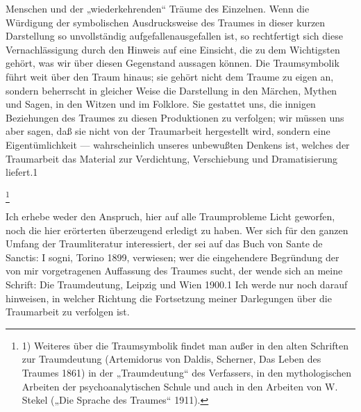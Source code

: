 \documentclass[twoside=true,titlepage=false,open=any, parskip=never, fontsize=10pt, headings=small, chapterprefix=false, appendixprefix=false]{scrbook}
\begin{document}
         
            
            
            
        \pstart
        Menschen und der „wiederkehrenden“ Träume des Einzelnen. Wenn die
               Würdigung der symbolischen Ausdrucksweise des Traumes in dieser kurzen
               Darstellung so unvollständig aufgefallenausgefallen ist, so rechtfertigt sich diese
               Vernachlässigung durch den Hinweis auf eine Einsicht, die zu dem
               Wichtigsten gehört, was wir über diesen Gegenstand aussagen können. Die
               Traumsymbolik führt weit über den Traum hinaus; sie gehört nicht dem Traume
               zu eigen an, sondern beherrscht in gleicher Weise die Darstellung in den
               Märchen, Mythen und Sagen, in den Witzen und im Folklore. Sie gestattet uns, die
               innigen Beziehungen des Traumes zu diesen Produktionen zu verfolgen; wir müssen
               uns aber sagen, daß sie nicht von der Traumarbeit hergestellt wird, sondern
               eine Eigentümlichkeit — wahrscheinlich unseres unbewußten Denkens
               ist, welches der Traumarbeit das Material zur Verdichtung, Verschiebung und
               Dramatisierung liefert.1
        \pend
    
            
        \footnote{1) Weiteres über die
               Traumsymbolik findet man außer in den alten Schriften zur Traumdeutung (Artemidorus von Daldis, Scherner, Das Leben des
               Traumes 1861) in der „Traumdeutung“ des Verfassers, in den mythologischen
               Arbeiten der psychoanalytischen Schule und auch in den Arbeiten von W. Stekel („Die Sprache des Traumes“ 1911).}
    
         
            
            
            \pend
            
        \pstart
        Ich erhebe weder den Anspruch, hier auf alle Traumprobleme Licht geworfen, noch
               die hier erörterten überzeugend erledigt zu haben. Wer sich für den ganzen
               Umfang der Traumliteratur interessiert, der sei auf das Buch von Sante de Sanctis:
               I sogni, Torino 1899, verwiesen; wer die eingehendere
                  Begründung der von mir vorgetragenen Auffassung des Traumes
               sucht, der wende sich an meine Schrift: Die
                  Traumdeutung, Leipzig und Wien 1900.1 Ich werde nur noch darauf hinweisen, in welcher Richtung die
               Fortsetzung meiner Darlegungen über die Traumarbeit zu verfolgen ist.
        \pend
    
\end{document}
